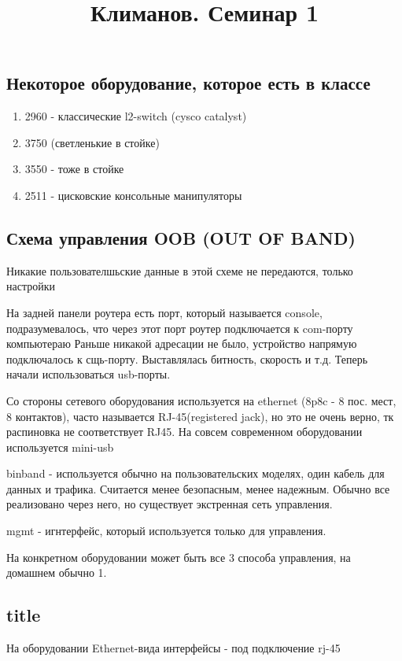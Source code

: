 \documentclass[a4paper,12pt]{article}
\title{Климанов. Семинар 1}
\begin{document}
	\maketitle
\subsection{Некоторое оборудование, которое есть в классе}
\begin{enumerate}
	\item 2960 - классические l2-switch (cysco catalyst)
	\item 3750 (светленькие в стойке)
	\item 3550 - тоже в стойке
	\item 2511 - цисковские консольные манипуляторы
	
\end{enumerate}

\subsection{Схема управления OOB (OUT OF BAND)}
Никакие пользователшьские данные в этой схеме не передаются, только настройки

На задней панели роутера есть порт, который называется console, подразумевалось, что через этот порт роутер подключается к com-порту компьютераю
Раньше никакой адресации не было, устройство напрямую подключалось к сщь-порту. Выставлялась битность, скорость и т.д.
Теперь начали использоваться usb-порты.

Со стороны сетевого оборудования используется на ethernet (8p8c - 8 пос. мест, 8 контактов), часто называется RJ-45(registered jack), но это не очень верно, тк распиновка не соответствует RJ45.
На совсем современном оборудовании используется mini-usb

binband - используется обычно на пользовательских моделях, один кабель для данных и трафика. Считается менее безопасным, менее надежным. Обычно все реализовано через него, но существует экстренная сеть управления.

mgmt - игнтерфейс, который используется только для управления.

На конкретном оборудовании может быть все 3 способа управления, на домашнем обычно 1.

\subsection{title}

На оборудовании Ethernet-вида интерфейсы - под подключение rj-45
\end{document}
